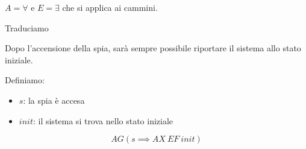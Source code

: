 $A=\forall$ e $E= \exists$ che si applica ai cammini.
\begin{esempio}
    Traduciamo
    \begin{center}
        Dopo l'accensione della spia, sarà sempre possibile riportare il sistema
        allo stato iniziale.
    \end{center}
    Definiamo:
    \begin{itemize}
        \item $s$: la spia è accesa
        \item $init$: il sistema si trova nello stato iniziale
    \end{itemize}
    \begin{equation}
        AG(s\implies AX \ EF \ init)
    \end{equation}
\end{esempio}
